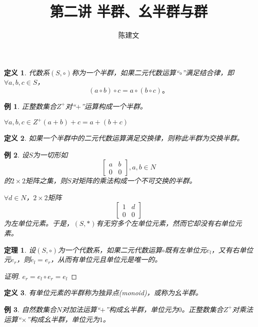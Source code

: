 \documentclass{article}
\newtheorem{Def}{定义}
\newtheorem{Thm}{定理}
\newtheorem*{Example}{例}
\begin{document}
\begin{CJK*}{UTF8}{gbsn}
  \title{第二讲 半群、幺半群与群}
  \author{陈建文}
  \maketitle
  \begin{Def}
    代数系$(S,\circ)$称为一个半群，如果二元代数运算“$\circ$”满足结合律，即$\forall a,b,c \in S$，
    \[(a\circ b) \circ c = a \circ (b\circ c)\text{。}\] 
  \end{Def}
  
  \begin{Example}
    正整数集合$Z^+$对“$+$”运算构成一个半群。
  \end{Example}
  
  $\forall a,b,c \in Z^+ (a+b)+c = a + (b + c)$
  
  \begin{Def}
    如果一个半群中的二元代数运算满足交换律，则称此半群为交换半群。
  \end{Def}
  
  \begin{Example}
    设$S$为一切形如
    \[\begin{bmatrix}
      a&b\\
      0&0
    \end{bmatrix},a,b\in N\]
  的$2\times 2$矩阵之集，则$S$对矩阵的乘法构成一个不可交换的半群。
  
  $\forall d\in N$，$2\times 2$矩阵
  \[\begin{bmatrix}1&d\\0&0\end{bmatrix}\]
  为左单位元素。于是，$(S,*)$有无穷多个左单位元素，然而它却没有右单位元素。
  \end{Example}
  
  \begin{Thm}
    设$(S,\circ)$为一个代数系，如果二元代数运算$\circ$既有左单位元$e_l$，又有右单位元$e_r$，则$e_l=e_r$，从而有单位元且单位元是唯一的。
  \end{Thm}
  \begin{proof}[证明]
    $e_r=e_l\circ e_r=e_l$
  \end{proof}
  \begin{Def}
    有单位元素的半群称为独异点(monoid)，或称为幺半群。
  \end{Def}
  
  \begin{Example}
    自然数集合$N$对加法运算“$+$”构成幺半群，单位元为$0$。正整数集合$Z^+$对乘法运算“$\times$”构成幺半群，单位元为$1$。
  \end{Example}
  

\end{CJK*}
\end{document}
